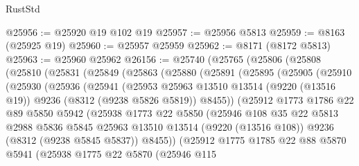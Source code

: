 \begin{lexlean}{RustStd}
\begin{coremodule}
@25956 := @25920 @19 @102 @19
@25957 := @25956 @5813
@25959 := @8163 (@25925 @19)
@25960 := @25957 @25959
@25962 := @8171 (@8172 @5813)
@25963 := @25960 @25962
@26156 := @25740
    (@25765
      (@25806
        (@25808
          (@25810
            (@25831
              (@25849
                (@25863
                  (@25880
                    (@25891
                      (@25895
                        (@25905
                          (@25910
                            (@25930
                              (@25936
                                (@25941
                                  (@25953
                                    @25963
                                    @13510
                                    @13514
                                    (@9220 (@13516 @19))
                                    @9236
                                    (@8312 (@9238 @5826 @5819))
                                    @8455))
                                (@25912
                                  @1773
                                  @1786
                                  @22
                                  @89
                                  @5850
                                  @5942
                                  (@25938
                                    @1773
                                    @22
                                    @5850
                                    (@25946
                                      @108
                                      @35
                                      @22
                                      @5813
                                      @2988
                                      @5836
                                      @5845
                                      @25963
                                      @13510
                                      @13514
                                      (@9220 (@13516 @108))
                                      @9236
                                      (@8312 (@9238 @5845 @5837))
                                      @8455))
                                  (@25912
                                    @1775
                                    @1785
                                    @22
                                    @88
                                    @5870
                                    @5941
                                    (@25938
                                      @1775
                                      @22
                                      @5870
                                      (@25946
                                        @115

\end{coremodule}
\end{lexlean}
